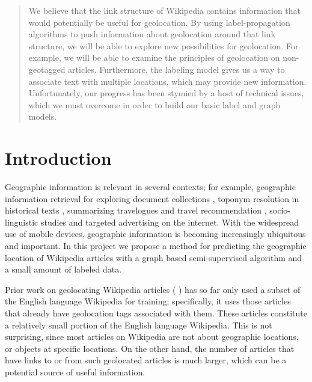 \begin{abstract}
    We believe that the link structure of Wikipedia contains information that
    would potentially be useful for geolocation.
    By using label-propagation algorithms to push information about geolocation
    around that link structure, we will be able to explore new possibilities
    for geolocation. 
    For example, we will be able to examine the principles of geolocation on
    non-geotagged articles.
    Furthermore, the labeling model gives us a way to associate text with
    multiple locations, which may provide new information.
    Unfortunately, our progress has been stymied by a host of technical issues,
    which we must overcome in order to build our basic label and graph models.
\end{abstract}

\section{Introduction}
Geographic information is relevant in several contexts; for example, geographic
information retrieval for exploring document collections
\cite{ding2000computing}, toponym resolution in historical texts
\cite{smith2001disambiguating}, summarizing travelogues and travel
recommendation \cite{hao-et-al:10}, socio-linguistic studies
\cite{eisenstein-smith-xing:11} and targeted advertising on the internet. 
With the widespread use of mobile devices, geographic information is becoming
increasingly ubiquitous and important. 
In this project we propose a method for predicting the geographic location of
Wikipedia articles with a graph based semi-supervised algorithm and a small
amount of labeled data.

Prior work on geolocating Wikipedia articles (\cite{wing-baldridge:11}
\cite{rolleretal:12}) has so far only used a subset of the English language
Wikipedia for training; specifically, it uses those articles that already have
geolocation tags associated with them. 
These articles constitute a relatively small portion of the English language
Wikipedia.  
This is not surprising, since most articles on Wikipedia are not about
geographic locations, or objects at specific locations.
On the other hand, the number of articles that have links to or from such
geolocated articles is much larger, which can be a potential source of useful
information. 

